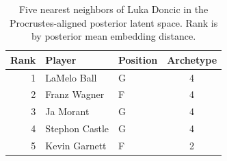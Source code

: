 \begin{table}[htbp]
  \centering\small
  \begin{tabular}{rllc}
    \toprule
    Rank & Player & Position & Archetype \\
    \midrule
    1 & LaMelo Ball & G & 4 \\
    2 & Franz Wagner & F & 4 \\
    3 & Ja Morant & G & 4 \\
    4 & Stephon Castle & G & 4 \\
    5 & Kevin Garnett & F & 2 \\
    \bottomrule
  \end{tabular}
  \caption{Five nearest neighbors of Luka Doncic in the Procrustes-aligned posterior latent space. Rank is by posterior mean embedding distance.}
  \label{tab:Luka_Doncic_neighbors}
\end{table}

